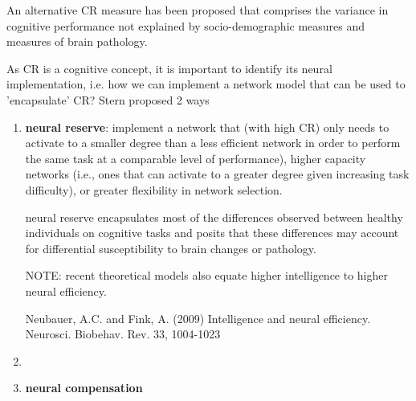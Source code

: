 An alternative CR measure has been proposed that comprises the variance in
cognitive performance not explained by socio-demographic measures and measures
of brain pathology.

As CR is a cognitive concept, it is important to
identify its neural implementation, i.e. how we can implement a network model
that can be used to 'encapsulate' CR? Stern proposed 2 ways

\begin{enumerate}
  \item {\bf neural reserve}: implement a network that (with high CR) only needs
  to activate to a smaller degree than a less efficient network in order to
  perform the same task at a comparable level of performance), higher capacity networks (i.e., ones that can
activate to a greater degree given increasing task difficulty), or greater
flexibility in network selection.

neural
reserve encapsulates most of the differences observed
between healthy individuals on cognitive tasks and posits
that these differences may account for differential susceptibility
to brain changes or pathology.

NOTE: recent theoretical models also equate higher intelligence to higher
neural efficiency.

Neubauer, A.C. and Fink, A. (2009) Intelligence and neural efficiency.
Neurosci. Biobehav. Rev. 33, 1004-1023


  \item 
 
  
  
  \item {\bf neural compensation}
\end{enumerate}


